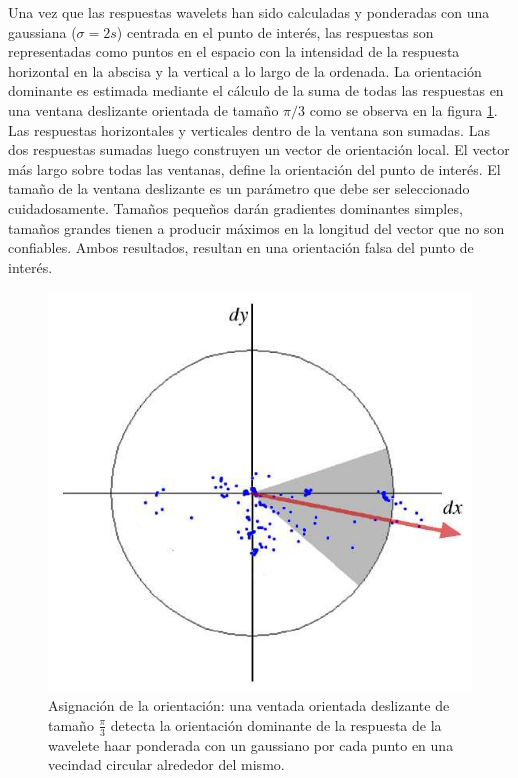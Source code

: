 Una vez que las respuestas wavelets han sido calculadas y ponderadas con una gaussiana ($\sigma = 2s$) centrada en el punto de interés, las respuestas son representadas como puntos en el espacio con la intensidad de la respuesta horizontal en la abscisa y la vertical a lo largo de la ordenada. La orientación dominante es estimada mediante el cálculo de la suma de todas las respuestas en una ventana deslizante orientada de tamaño $\pi/3$ como se observa en la figura \ref{fig:responsecalculate}. Las respuestas horizontales y verticales dentro de la ventana son sumadas. Las dos respuestas sumadas luego construyen un vector de orientación local. El vector más largo sobre todas las ventanas, define la orientación del punto de interés. El tamaño de la ventana deslizante es un parámetro que debe ser seleccionado cuidadosamente. Tamaños pequeños darán gradientes dominantes simples, tamaños grandes tienen a producir máximos en la longitud del vector que no son confiables. Ambos resultados, resultan en una orientación falsa del punto de interés.

\begin{figure}[tbhp]
   \centering
        \includegraphics[scale=0.4]{./figs/responsecalculate}
    \caption[Asignación de la orientación]{Asignación de la orientación: una ventada orientada deslizante de tamaño $\frac{\pi}{3}$ detecta la orientación dominante de la respuesta de la wavelete haar ponderada con un gaussiano por cada punto en una vecindad circular alrededor del mismo.}
   \label{fig:responsecalculate}                %
\end{figure}

